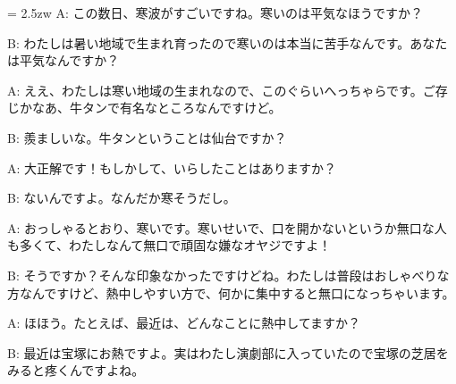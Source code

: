 \documentclass[11pt]{amsart}
\title{}
\author{}
\newenvironment{hangall}[1]{\hangindent = 2.5zw\everypar{\hangindent = 2.5zw}}{}
\begin{document}
\maketitle
\begin{hangall}{}%
A: この数日、寒波がすごいですね。寒いのは平気なほうですか？

B: わたしは暑い地域で生まれ育ったので寒いのは本当に苦手なんです。あなたは平気なんですか？

A: ええ、わたしは寒い地域の生まれなので、このぐらいへっちゃらです。ご存じかなあ、牛タンで有名なところなんですけど。

B: 羨ましいな。牛タンということは仙台ですか？

A: 大正解です！もしかして、いらしたことはありますか？

B: ないんですよ。なんだか寒そうだし。

A: おっしゃるとおり、寒いです。寒いせいで、口を開かないというか無口な人も多くて、わたしなんて無口で頑固な嫌なオヤジですよ！

B: そうですか？そんな印象なかったですけどね。わたしは普段はおしゃべりな方なんですけど、熱中しやすい方で、何かに集中すると無口になっちゃいます。

A: ほほう。たとえば、最近は、どんなことに熱中してますか？

B: 最近は宝塚にお熱ですよ。実はわたし演劇部に入っていたので宝塚の芝居をみると疼くんですよね。
\end{hangall}
\end{document}
